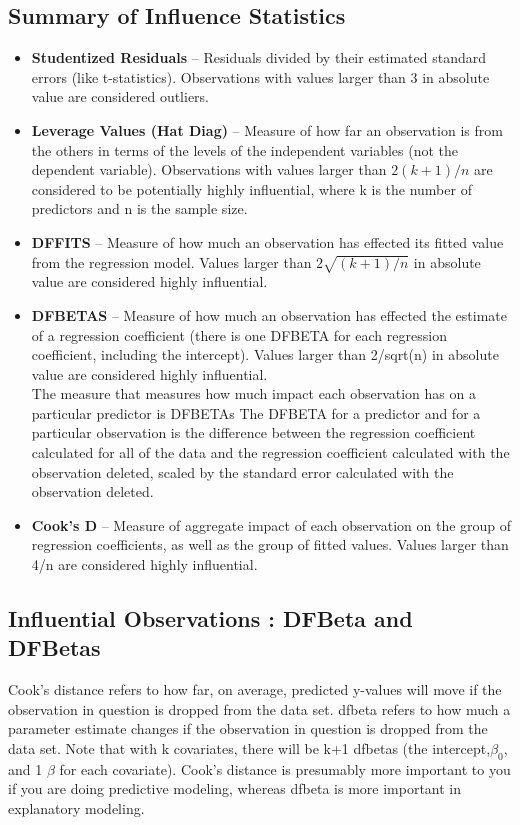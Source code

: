 \subsection{Summary of Influence Statistics}
\begin{itemize}
\item	\textbf{Studentized Residuals} – Residuals divided by their estimated standard errors (like t-statistics). Observations with values larger than 3 in absolute value are considered outliers.
\item	\textbf{Leverage Values (Hat Diag)} – Measure of how far an observation is from the others in terms of the levels of the independent variables (not the dependent variable). Observations with values larger than $2(k+1)/n$ are considered to be potentially highly influential, where k is the number of predictors and n is the sample size.
\item	\textbf{DFFITS} – Measure of how much an observation has effected its fitted value from the regression model. Values larger than $2\sqrt{(k+1)/n}$ in absolute value are considered highly influential. %
\item	\textbf{DFBETAS} – Measure of how much an observation has effected the estimate of a regression coefficient (there is one DFBETA for each regression coefficient, including the intercept). Values larger than 2/sqrt(n) in absolute value are considered highly influential.
\\
The measure that measures how much impact each observation has on a particular predictor is DFBETAs The DFBETA for a predictor and for a particular observation is the difference between the regression coefficient calculated for all of the data and the regression coefficient calculated with the observation deleted, scaled by the standard error calculated with the observation deleted. 

\item	\textbf{Cook’s D} – Measure of aggregate impact of each observation on the group of regression coefficients, as well as the group of fitted values. Values larger than 4/n are considered highly influential.
\end{itemize}


\subsection{Influential Observations : DFBeta and DFBetas}
Cook's distance refers to how far, on average, predicted y-values will move if the observation in question is dropped from the data set. dfbeta refers to how much a parameter estimate changes if the observation in question is dropped from the data set. Note that with k covariates, there will be k+1 dfbetas (the intercept,$\beta_0$, and 1 $\beta$ for each covariate). Cook's distance is presumably more important to you if you are doing predictive modeling, whereas dfbeta is more important in explanatory modeling.

